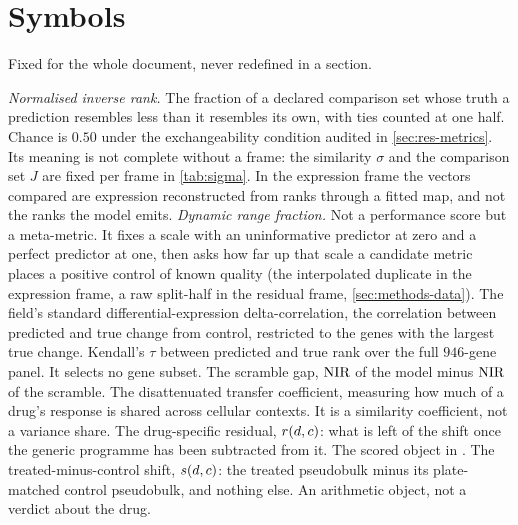 \section*{Symbols}

\noindent
Fixed for the whole document, never redefined in a section.

\begin{description}[labelwidth=5em, leftmargin=6em, labelsep=0.6em,
                    style=multiline, font=\normalfont, itemsep=0.5ex]
 \emph{Normalised inverse rank.} The fraction of a declared
  comparison set whose truth a prediction resembles less than it resembles its
  own, with ties counted at one half. Chance is $0.50$ under the exchangeability
  condition audited in \cref{sec:res-metrics}. Its meaning is not complete
  without a frame: the similarity $\sigma$ and the comparison set $J$ are fixed
  per frame in \cref{tab:sigma}. In the expression frame the vectors compared
  are expression reconstructed from ranks through a fitted map, and not the
  ranks the model emits.
 \emph{Dynamic range fraction.} Not a performance score but
  a meta-metric. It fixes a scale with an uninformative predictor at zero and a
  perfect predictor at one, then asks how far up that scale a candidate metric
  places a positive control of known quality (the interpolated duplicate in the
  expression frame, a raw split-half in the residual frame,
  \cref{sec:methods-data}).
 The field's standard differential-expres\-sion
  delta-cor\-re\-la\-tion, the correlation between predicted and true change
  from control, restricted to the genes with the largest true change.
 Kendall's $\tau$ between predicted and true rank
  over the full $946$-gene panel. It selects no gene subset.
 The scramble gap, $\textrm{NIR}$ of the model minus $\textrm{NIR}$ of the
  scramble.
 The disattenuated transfer coefficient, measuring how
  much of a drug's response is shared across cellular contexts. It is a
  similarity coefficient, not a variance share.
 The drug-specific residual, $r(d,c)$: what is
  left of the shift once the generic programme has been subtracted from it. The
  scored object in \Rframe.
 The treated-minus-control shift, $s(d,c)$: the
  treated pseudobulk minus its plate-matched control pseudobulk, and nothing
  else. An arithmetic object, not a verdict about the drug.

\end{description}
